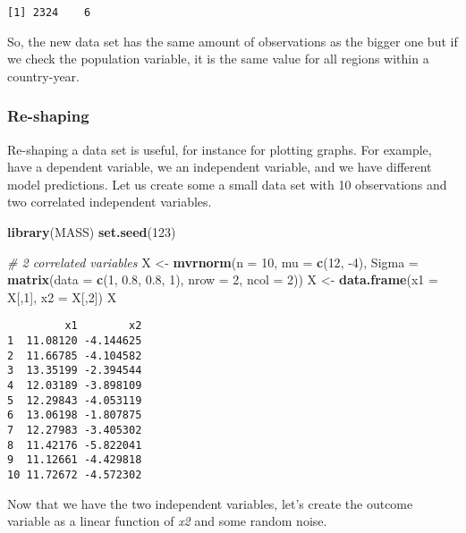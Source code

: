 \documentclass[]{article}
\newenvironment{Shaded}{\begin{snugshade}}{\end{snugshade}}
\newcommand{\CommentTok}[1]{\textcolor[rgb]{0.56,0.35,0.01}{\textit{#1}}}
\newcommand{\DataTypeTok}[1]{\textcolor[rgb]{0.13,0.29,0.53}{#1}}
\newcommand{\DecValTok}[1]{\textcolor[rgb]{0.00,0.00,0.81}{#1}}
\newcommand{\FloatTok}[1]{\textcolor[rgb]{0.00,0.00,0.81}{#1}}
\newcommand{\KeywordTok}[1]{\textcolor[rgb]{0.13,0.29,0.53}{\textbf{#1}}}
\newcommand{\NormalTok}[1]{#1}
\newcommand{\StringTok}[1]{\textcolor[rgb]{0.31,0.60,0.02}{#1}}
\begin{document}
\begin{verbatim}
[1] 2324    6
\end{verbatim}

So, the new data set has the same amount of observations as the bigger one but if we check the population variable, it is the same value for all regions within a country-year.

\hypertarget{re-shaping}{%
\subsubsection{Re-shaping}\label{re-shaping}}

Re-shaping a data set is useful, for instance for plotting graphs. For example, have a dependent variable, we an independent variable, and we have different model predictions. Let us create some a small data set with 10 observations and two correlated independent variables.

\begin{Shaded}
\begin{Highlighting}[]
\KeywordTok{library}\NormalTok{(MASS)}
\KeywordTok{set.seed}\NormalTok{(}\DecValTok{123}\NormalTok{)}

\CommentTok{# 2 correlated variables}
\NormalTok{X <-}\StringTok{ }\KeywordTok{mvrnorm}\NormalTok{(}\DataTypeTok{n =} \DecValTok{10}\NormalTok{, }\DataTypeTok{mu =} \KeywordTok{c}\NormalTok{(}\DecValTok{12}\NormalTok{, }\DecValTok{-4}\NormalTok{), }\DataTypeTok{Sigma =} \KeywordTok{matrix}\NormalTok{(}\DataTypeTok{data =} \KeywordTok{c}\NormalTok{(}\DecValTok{1}\NormalTok{, }\FloatTok{0.8}\NormalTok{, }\FloatTok{0.8}\NormalTok{, }\DecValTok{1}\NormalTok{), }\DataTypeTok{nrow =} \DecValTok{2}\NormalTok{, }\DataTypeTok{ncol =} \DecValTok{2}\NormalTok{))}
\NormalTok{X <-}\StringTok{ }\KeywordTok{data.frame}\NormalTok{(}\DataTypeTok{x1 =}\NormalTok{ X[,}\DecValTok{1}\NormalTok{], }\DataTypeTok{x2 =}\NormalTok{ X[,}\DecValTok{2}\NormalTok{])}
\NormalTok{X}
\end{Highlighting}
\end{Shaded}

\begin{verbatim}
         x1        x2
1  11.08120 -4.144625
2  11.66785 -4.104582
3  13.35199 -2.394544
4  12.03189 -3.898109
5  12.29843 -4.053119
6  13.06198 -1.807875
7  12.27983 -3.405302
8  11.42176 -5.822041
9  11.12661 -4.429818
10 11.72672 -4.572302
\end{verbatim}

Now that we have the two independent variables, let's create the outcome variable as a linear function of \emph{x2} and some random noise.
\end{document}
